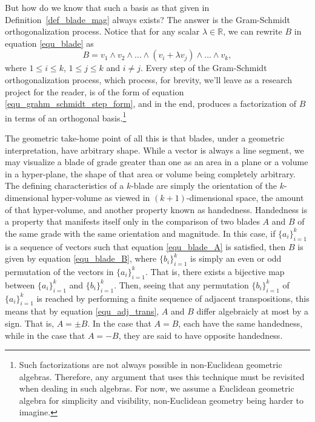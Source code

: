 \documentclass[12pt]{article}
\numberwithin{equation}{section}
\newcommand{\R}{\mathbb{R}}
\begin{document}
But how do we know that such a basis as that given in Definition~\ref{def_blade_mag} always exists?
The answer is the Gram-Schmidt orthogonalization process.
Notice that for any scalar $\lambda\in\R$,
we can rewrite $B$ in equation \eqref{equ_blade} as
\begin{equation}\label{equ_grahm_schmidt_step_form}
B = v_1\wedge v_2\wedge\dots\wedge(v_i+\lambda v_j)\wedge\dots\wedge v_k,
\end{equation}
where $1\leq i\leq k$, $1\leq j\leq k$ and $i\neq j$.  Every step of the Gram-Schmidt
orthogonalization process, which process, for brevity, we'll leave as a research project for the reader,
is of the form of equation \eqref{equ_grahm_schmidt_step_form}, and in the end, produces
a factorization of $B$ in terms of an orthogonal basis.\footnote{Such factorizations are not
always possible in non-Euclidean geometric algebras.  Therefore, any argument that uses
this technique must be revisited when dealing in such algebras.  For now, we assume a
Euclidean geometric algebra for simplicity and visibility, non-Euclidean geometry being harder to imagine.}

The geometric take-home point of all this is that blades, under a geometric interpretation,
have arbitrary shape.  While a vector is always a line segment, we may visualize a blade of
grade greater than one
as an area in a plane or a volume in a hyper-plane, the shape of that area or volume being completely
arbitrary.  The defining characteristics of a $k$-blade are simply the orientation of the $k$-dimensional
hyper-volume as viewed in $(k+1)$-dimensional space,
the amount of that hyper-volume, and another property known as handedness.
Handedness is a property
that manifests itself only in the comparison of two blades $A$ and $B$ of the same grade with
the same orientation
and magnitude.  In this case, if $\{a_i\}_{i=1}^k$ is a sequence of vectors such
that equation \eqref{equ_blade_A} is satisfied, then $B$ is given by equation
\eqref{equ_blade_B}, where $\{b_i\}_{i=1}^k$ is simply an even or odd permutation
of the vectors in $\{a_i\}_{i=1}^k$.  That is, there exists a bijective map between
$\{a_i\}_{i=1}^k$ and $\{b_i\}_{i=1}^k$.
Then, seeing that any permutation $\{b_i\}_{i=1}^k$ of $\{a_i\}_{i=1}^k$
is reached by performing a finite sequence of adjacent transpositions, this means that
by equation \eqref{equ_adj_trans}, $A$ and $B$ differ algebraicly at most by a sign.
That is, $A=\pm B$.  In the case that $A=B$, each have the same handedness,
while in the case that $A=-B$, they are said to have opposite handedness.
\end{document}
